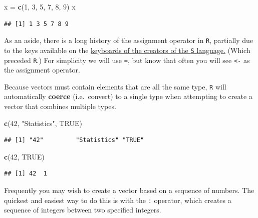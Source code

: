 \documentclass[]{book}
\newenvironment{Shaded}{\begin{snugshade}}{\end{snugshade}}
\newcommand{\KeywordTok}[1]{\textcolor[rgb]{0.13,0.29,0.53}{\textbf{#1}}}
\newcommand{\DecValTok}[1]{\textcolor[rgb]{0.00,0.00,0.81}{#1}}
\newcommand{\StringTok}[1]{\textcolor[rgb]{0.31,0.60,0.02}{#1}}
\newcommand{\OtherTok}[1]{\textcolor[rgb]{0.56,0.35,0.01}{#1}}
\newcommand{\NormalTok}[1]{#1}
\theoremstyle{definition}
\theoremstyle{definition}
\theoremstyle{definition}
\theoremstyle{remark}
\begin{document}
\begin{Shaded}
\begin{Highlighting}[]
\NormalTok{x =}\StringTok{ }\KeywordTok{c}\NormalTok{(}\DecValTok{1}\NormalTok{, }\DecValTok{3}\NormalTok{, }\DecValTok{5}\NormalTok{, }\DecValTok{7}\NormalTok{, }\DecValTok{8}\NormalTok{, }\DecValTok{9}\NormalTok{)}
\NormalTok{x}
\end{Highlighting}
\end{Shaded}

\begin{verbatim}
## [1] 1 3 5 7 8 9
\end{verbatim}

As an aside, there is a long history of the assignment operator in
\texttt{R}, partially due to the keys available on the
\href{https://twitter.com/kwbroman/status/747829864091127809}{keyboards
of the creators of the \texttt{S} language.} (Which preceded
\texttt{R}.) For simplicity we will use \texttt{=}, but know that often
you will see \texttt{\textless{}-} as the assignment operator.

Because vectors must contain elements that are all the same type,
\texttt{R} will automatically \textbf{coerce} (i.e.~convert) to a single
type when attempting to create a vector that combines multiple types.

\begin{Shaded}
\begin{Highlighting}[]
\KeywordTok{c}\NormalTok{(}\DecValTok{42}\NormalTok{, }\StringTok{"Statistics"}\NormalTok{, }\OtherTok{TRUE}\NormalTok{)}
\end{Highlighting}
\end{Shaded}

\begin{verbatim}
## [1] "42"         "Statistics" "TRUE"
\end{verbatim}

\begin{Shaded}
\begin{Highlighting}[]
\KeywordTok{c}\NormalTok{(}\DecValTok{42}\NormalTok{, }\OtherTok{TRUE}\NormalTok{)}
\end{Highlighting}
\end{Shaded}

\begin{verbatim}
## [1] 42  1
\end{verbatim}

Frequently you may wish to create a vector based on a sequence of
numbers. The quickest and easiest way to do this is with the \texttt{:}
operator, which creates a sequence of integers between two specified
integers.
\end{document}
